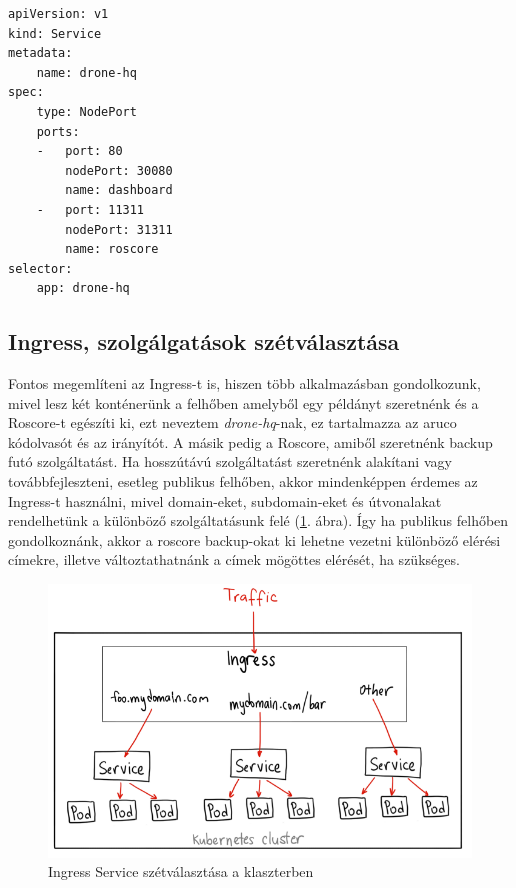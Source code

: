 \begin{minipage}{\linewidth}
\begin{lstlisting}[caption={Service kiegészítése NodePort-okkal},label={lst:nodeport}]
apiVersion: v1
kind: Service
metadata:
	name: drone-hq
spec:
	type: NodePort
	ports:
	-	port: 80
		nodePort: 30080
		name: dashboard
	-	port: 11311
		nodePort: 31311
		name: roscore
selector:
	app: drone-hq
\end{lstlisting}
\end{minipage}

\subsection{Ingress, szolgálgatások szétválasztása}
Fontos megemlíteni az Ingress-t is, hiszen több alkalmazásban gondolkozunk, mivel lesz két konténerünk a felhőben amelyből egy példányt szeretnénk és a Roscore-t egészíti ki, ezt neveztem \emph{drone-hq}-nak, ez tartalmazza az aruco kódolvasót és az irányítót. A másik pedig a Roscore, amiből szeretnénk backup futó szolgáltatást. Ha hosszútávú szolgáltatást szeretnénk alakítani vagy továbbfejleszteni, esetleg publikus felhőben, akkor mindenképpen érdemes az Ingress-t használni, mivel domain-eket, subdomain-eket és útvonalakat rendelhetünk a különböző szolgáltatásunk felé (\ref{fig:ingress}. ábra). Így ha publikus felhőben gondolkoznánk, akkor a roscore backup-okat ki lehetne vezetni különböző elérési címekre, illetve változtathatnánk a címek mögöttes elérését, ha szükséges.

\begin{figure}
	\centering
	\includegraphics[width=\linewidth]{figures/ingress.png}
	\caption{Ingress Service szétválasztása a klaszterben \cite{nodeport}}
	\label{fig:ingress}
\end{figure}

